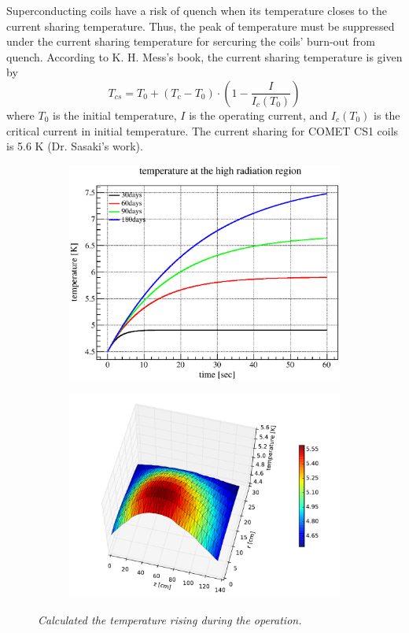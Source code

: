 Superconducting coils have a risk of quench when its temperature closes to the current sharing temperature.
Thus, the peak of temperature must be suppressed under the current sharing temperature for sercuring the coils' burn-out from quench.
According to K. H. Mess's book, the current sharing temperature is given by
\begin{equation}
 T_{cs} = T_0 + (T_c - T_0)\cdot (1 - \frac{I}{I_c(T_0)})
\end{equation}
where $T_0$ is the initial temperature, $I$ is the operating current, and $I_c(T_0)$ is the critical current in initial temperature.
The current sharing for COMET CS1 coils is 5.6 K (Dr. Sasaki's work).
 \begin{figure}[H]
   \begin{subfigure}{0.3\textwidth}
    \centering
	\includegraphics[scale=0.42]{chapter5/fig/time.eps}
   \end{subfigure}
   \hspace{0.2\textwidth}
   \begin{subfigure}{0.3\textwidth}
    \centering
	\includegraphics[scale=0.42]{chapter5/fig/heatdis.pdf}
   \end{subfigure}
   \caption{\it Calculated the temperature rising during the operation.}
   \label{4heatdis}
  \end{figure}
